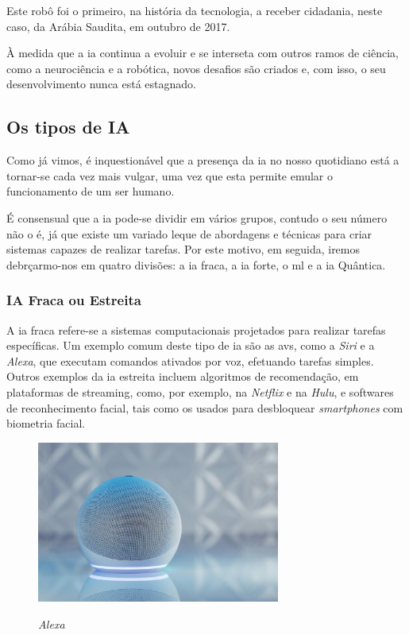 \documentclass{report}
\begin{document}
\nocite{sophia}

	Este robô foi o primeiro, na história da tecnologia, a receber cidadania, neste caso, da Arábia Saudita, em outubro de 2017.

	À medida que a \ac{ia} continua a evoluir e se interseta com outros ramos de ciência, como a neurociência e a robótica, novos desafios são criados e, com isso, o seu desenvolvimento nunca está estagnado. \cite{historia}

\subsection{Os tipos de IA}
\label{subsec.os_tipos_de_ia}

	Como já vimos, é inquestionável que a presença da \ac{ia} no nosso quotidiano está a tornar-se cada vez mais vulgar, uma vez que esta permite emular o funcionamento de um ser humano.

	É consensual que a \ac{ia} pode-se dividir em vários grupos, contudo o seu número não o é, já que existe um variado leque de abordagens e técnicas para criar sistemas capazes de realizar tarefas. Por este motivo, em seguida, iremos debrçarmo-nos em quatro divisões: a \ac{ia} fraca, a \ac{ia} forte, o \ac{ml} e a \ac{ia} Quântica.
	
\subsubsection{IA Fraca ou Estreita}
\label{subsubsec.ia_fraca}

	A \ac{ia} fraca refere-se a sistemas computacionais projetados para realizar tarefas específicas. Um exemplo comum deste tipo de \ac{ia} são as \ac{avs}, como a \textit{Siri} e a \textit{Alexa}, que executam comandos ativados por voz, efetuando tarefas simples. Outros exemplos da \ac{ia} estreita incluem algoritmos de recomendação, em plataformas de streaming, como, por exemplo, na \textit{Netflix} e na \textit{Hulu}, e softwares de reconhecimento facial, tais como os usados para desbloquear \textit{smartphones} com biometria facial. \cite{iafraca}
	
\begin{figure}[H]
\caption{\textit{Alexa}}
\centering
\includegraphics[width=8cm]{imagens/alexa.jpg}
\label{alexa}
\end{figure}
\end{document}
